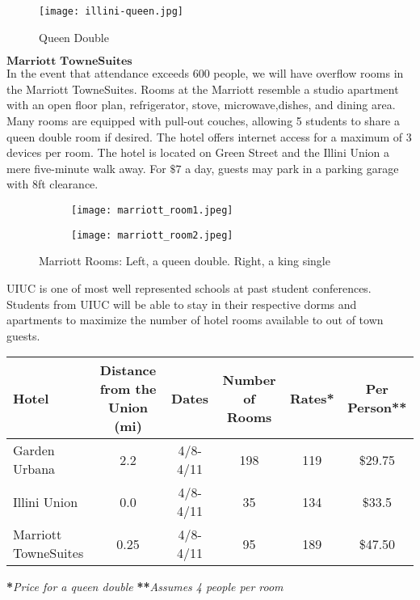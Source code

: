 \begin{figure}[H]
	\centering
	\texttt{[image: illini-queen.jpg]}
	\caption{Queen Double}		
\end{figure} 

$\textbf{Marriott TowneSuites}$\\
In the event that attendance exceeds 600 people, we will have overflow rooms in the Marriott TowneSuites. Rooms at the Marriott resemble a studio apartment with an open floor plan, refrigerator, stove, microwave,dishes, and dining area. Many rooms are equipped with pull-out couches, allowing 5 students to share a queen double room if desired. The hotel offers internet access for a maximum of 3 devices per room. The hotel is located on Green Street and the Illini Union a mere five-minute walk away. For $\$7$ a day, guests may park in a parking garage with 8ft clearance.\\
\begin{figure}[H]
	\centering
	\begin{subfigure}{0.5\textwidth}
		\centering
		\texttt{[image: marriott\_room1.jpeg]}
	\end{subfigure}%
	\begin{subfigure}{0.5\textwidth}
		\centering
		\texttt{[image: marriott\_room2.jpeg]}
	\end{subfigure}
	\caption{Marriott Rooms: Left, a queen double. Right, a king single}		
\end{figure} 

UIUC is one of most well represented schools at past student conferences. Students from UIUC will be able to stay in their respective dorms and apartments to maximize the number of hotel rooms available to out of town guests. 

{\centering
\begin{tabular}{lccccc}
\hline\hline
\textbf{Hotel} & \textbf{Distance from the Union (mi)} & \textbf{Dates} & \textbf{Number of Rooms} & \textbf{Rates*} & \textbf{Per Person**}\\
\hline\hline
Garden Urbana & 2.2  & 4/8-4/11 & 198 & 119 & $\$$29.75\\
Illini Union & 0.0 & 4/8-4/11 & 35 & 134 & $\$$33.5\\
Marriott TowneSuites &0.25 & 4/8-4/11 & 95 & 189 & \$47.50\\ 
\end{tabular}}
\textbf{*}\textit{Price for a queen double}
\textbf{**}\textit{Assumes 4 people per room}


